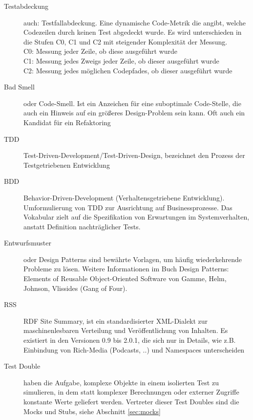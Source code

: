 \begin{description}
 \item[Testabdeckung] auch: Testfallabdeckung. Eine dynamische Code-Metrik die angibt, welche Codezeilen durch keinen Test abgedeckt wurde. Es wird unterschieden in die Stufen C0, C1 und C2 mit steigender Komplexität der Messung.\\
 C0: Messung jeder Zeile, ob diese ausgeführt wurde\\
 C1: Messung jedes Zweigs jeder Zeile, ob dieser ausgeführt wurde\\
 C2: Messung jedes möglichen Codepfades, ob dieser ausgeführt wurde
 \item[Bad Smell] oder Code-Smell. Ist ein Anzeichen für eine suboptimale Code-Stelle, die auch ein Hinweis auf ein größeres Design-Problem sein kann. Oft auch ein Kandidat für ein Refaktoring
 \item[TDD] Test-Driven-Development/Test-Driven-Design, bezeichnet den Prozess der Testgetriebenen Entwicklung
 \item[BDD] Behavior-Driven-Development (Verhaltensgetriebene Entwicklung). Umformulierung von TDD zur Ausrichtung auf Businessprozesse. Das Vokabular zielt auf die Spezifikation von Erwartungen im Systemverhalten, anstatt Definition nachträglicher Tests.
 \item[Entwurfsmuster] oder Design Patterns sind bewährte Vorlagen, um häufig wiederkehrende Probleme zu lösen. Weitere Informationen im Buch Design Patterns: Elements of Reusable Object-Oriented Software von Gamme, Helm, Johnson, Vlissides (Gang of Four).
\item[RSS] RDF Site Summary, ist ein standardisierter XML-Dialekt zur maschinenlesbaren Verteilung und Veröffentlichung von Inhalten. Es existiert in den Versionen 0.9 bis 2.0.1, die sich nur in Details, wie z.B. Einbindung von Rich-Media (Podcasts, ..) und Namespaces unterscheiden
  \item[Test Double] haben die Aufgabe, komplexe Objekte in einem isolierten Test zu simulieren, in dem statt komplexer Berechnungen oder externer Zugriffe konstante Werte geliefert werden. Vertreter dieser Test Doubles sind die Mocks und Stubs, siehe Abschnitt \ref{sec:mocks}
\end{description}
\newpage